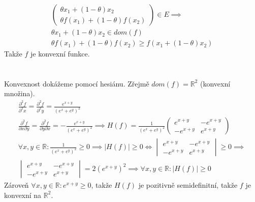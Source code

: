 \documentclass[12pt, a4paper]{article}
\begin{document}
\begin{gather*}
\begin{pmatrix} \theta x_1 + (1-\theta) x_2 \\ \theta f(x_1) + (1-\theta) f(x_2)\end{pmatrix} \in E \implies\\
\theta x_1 + (1-\theta) x_2 \in dom(f)\\
\theta f(x_1) + (1-\theta) f(x_2) \geq f( x_1 + (1-\theta) x_2)
\end{gather*}
Takže $f$ je konvexní funkce.

\section{}
Konvexnost dokážeme pomocí hesiánu. Zřejmě $dom(f) = \mathbb{R}^2$ (konvexní množina).
\begin{gather*}
\frac{\partial^2 f}{\partial^2 x} =  \frac{\partial^2 f}{\partial^2 y} = \frac{e^{x+y}}{(e^x+e^y)^2}\\
\frac{\partial^2 f}{\partial x \partial y} = \frac{\partial^2 f}{\partial y \partial x} = -\frac{e^{x+y}}{(e^x+e^y)^2} \implies
H(f) = \frac{1}{(e^x+e^y)^2}
\begin{pmatrix}
e^{x+y} & -e^{x+y}\\
-e^{x+y} & e^{x+y}
\end{pmatrix}\\
\forall x,y \in \mathbb{R}: \frac{1}{(e^x+e^y)^2} \geq 0 \implies
|H(f)| \geq 0 \iff 
\begin{vmatrix}
e^{x+y} & -e^{x+y}\\
-e^{x+y} & e^{x+y}
\end{vmatrix} \geq 0 \implies\\
\begin{vmatrix}
e^{x+y} & -e^{x+y}\\
-e^{x+y} & e^{x+y}
\end{vmatrix} = 2(e^{x+y})^2 \implies \forall x,y \in \mathbb{R}: |H(f)| \geq 0
\end{gather*}
Zároveň $\forall x,y \in \mathbb{R}: e^{x+y} \geq 0$, takže $H(f)$ je pozitivně semidefinitní, takže $f$ je konvexní na $\mathbb{R}^2$.
\end{document}
